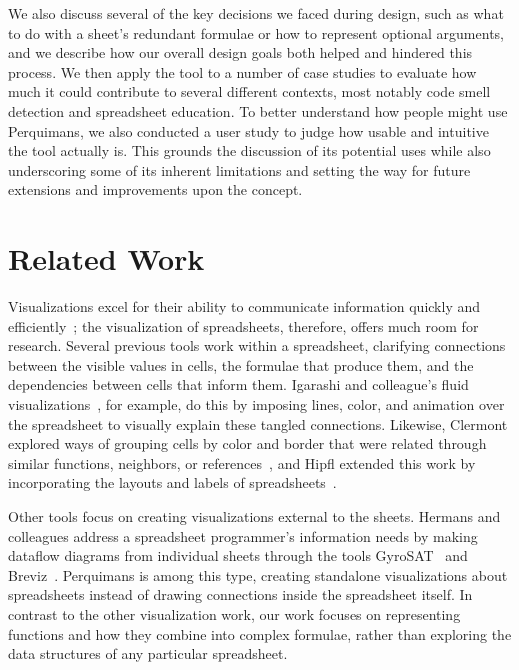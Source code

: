 \documentclass[conference]{IEEEtran}
\newcommand{\toolname}{Perquimans\xspace} \newcommand{\toolnameend}{Perquimans}
\begin{document}
	We also discuss several of the key decisions we faced during design, such as
	what to do with a sheet's redundant formulae or how to represent optional
	arguments, and we describe how our overall design goals both helped and
	hindered this process. We then apply the tool to a number of case studies to
	evaluate how much it could contribute to several different contexts, most
	notably code smell detection and spreadsheet education. To better understand
	how people might use \toolnameend, we also conducted a user study to judge how
	usable and intuitive the tool actually is. This grounds the discussion of its
	potential uses while also underscoring some of its inherent limitations and
	setting the way for future extensions and improvements upon the concept.
	
	\section{Related Work} \label{related-work} Visualizations excel for their
	ability to communicate information quickly and
	efficiently~\cite{baeza1999modern}; the visualization of spreadsheets,
	therefore, offers much room for research. Several previous tools work
	within a spreadsheet, clarifying connections between the visible
	values in cells, the formulae that produce them, and the dependencies between
	cells that inform them. Igarashi and colleague's fluid
	visualizations~\cite{igarashi1998fluid}, for example, do this by imposing
	lines, color, and animation over the spreadsheet to visually explain these
	tangled connections. Likewise, Clermont explored ways of grouping cells by
	color and border that were related through similar functions, neighbors, or
	references~\cite{clermont2003scalable}, and Hipfl extended this work by
	incorporating the layouts and labels of spreadsheets~\cite{hipfl2008using}.
	
	Other tools focus on creating visualizations external to the sheets. Hermans
	and colleagues address a spreadsheet programmer's information needs by making
	dataflow diagrams from individual sheets through the tools
	GyroSAT~\cite{hermans2011supporting} and Breviz~\cite{hermans2011breviz}.
	\toolname is among this type, creating standalone visualizations about
	spreadsheets instead of drawing connections inside the spreadsheet itself. In
	contrast to the other visualization work, our work focuses on representing
	functions and how they combine into complex formulae, rather than exploring the
	data structures of any particular spreadsheet.  \par
	
\end{document}

